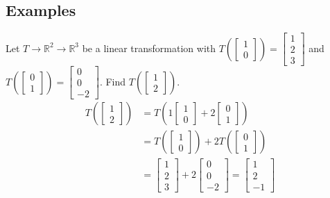 \begin{enumerate}
\subsection{Examples}
Let $T \rightarrow \mathbb{R}^2 \rightarrow \mathbb{R}^3$ be a linear transformation 
with $T(\begin{bmatrix} 1 \\ 0 \end{bmatrix}) = \begin{bmatrix} 1 \\ 2 \\ 3 \end{bmatrix}$ 
and $T(\begin{bmatrix} 0 \\ 1 \end{bmatrix}) = \begin{bmatrix} 0 \\ 0 \\ -2 \end{bmatrix}$. Find $T(\begin{bmatrix} 1 \\ 2 \end{bmatrix})$. 
\[
  \begin{aligned}
    T(\begin{bmatrix} 1 \\ 2 \end{bmatrix}) &= T(1 \begin{bmatrix} 
    1 \\ 0 \end{bmatrix} + 2 \begin{bmatrix}0 \\ 1 \end{bmatrix}) \\
                                            &= T(\begin{bmatrix} 1 \\ 
                                            0 \end{bmatrix}) + 
                                            2T(\begin{bmatrix} 0 \\ 1 
                                              \end{bmatrix}) \\
                                            &= \begin{bmatrix} 1 \\ 2 
                                            \\ 3 \end{bmatrix} + 
                                            2 \begin{bmatrix} 0 \\ 0 
                                            \\ -2 \end{bmatrix} = 
                                            \begin{bmatrix} 1 \\ 2 
                                            \\ -1 \end{bmatrix}
  \end{aligned}
\]

\end{enumerate}

